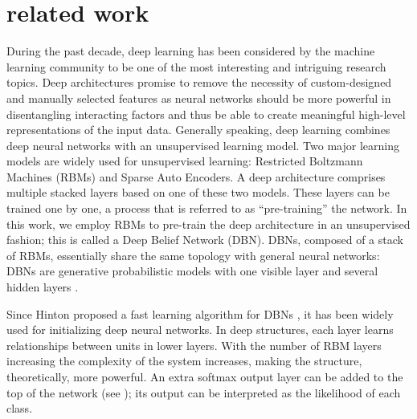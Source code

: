 \documentclass{article}
\begin{document}
%


\section{related work}
During the past decade, deep learning has been considered by the machine learning community to be one of the most interesting and intriguing research topics. Deep architectures promise to remove the necessity of custom-designed and manually selected features as neural networks should be more powerful in disentangling interacting factors and thus be able to create meaningful high-level representations of the input data. Generally speaking, deep learning combines deep neural networks with an unsupervised learning model. Two major learning models are widely used for unsupervised learning: Restricted Boltzmann Machines (RBMs) and Sparse Auto Encoders. A deep architecture comprises multiple stacked layers based on one of these two models. These layers can be trained one by one, a process that is referred to as ``pre-training'' the network. In this work, we employ RBMs to pre-train the deep architecture in an unsupervised fashion; this is called a Deep Belief Network (DBN). DBNs, composed of a stack of RBMs, essentially share the same topology with general neural networks: DBNs are generative probabilistic models with one visible layer and several hidden layers \cite{hinton2006fast}. 

Since Hinton proposed a fast learning algorithm for DBNs \cite{hinton2006fast}, it has been widely used for initializing deep neural networks. In deep structures, each layer learns relationships between units in lower layers. With the number of RBM layers increasing the complexity of the system increases, making the structure, theoretically, more powerful. An extra softmax output layer can be added to the top of the network (see ); its output can be interpreted as the likelihood of each class.
\end{document}
